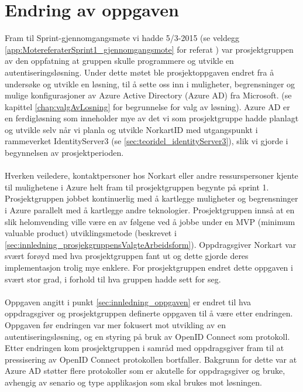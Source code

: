 \section{Endring av oppgaven}
\label{sec:innledning_endringAvOppgaven}
Fram til Sprint-gjennomgangsmøte vi hadde 5/3-2015 (se veldegg \ref{app:MotereferaterSprint1_gjennomgangsmote} for referat ) var prosjektgruppen av den oppfatning at gruppen skulle programmere og utvikle en autentiseringsløsning. Under dette møtet ble prosjektoppgaven endret fra å undersøke og utvikle en løsning, til å sette oss inn i muligheter, begrensninger og mulige konfigurasjoner av Azure Active Directory (Azure AD) fra Microsoft. (se kapittel \ref{chap:valgAvLosning} for begrunnelse for valg av løsning). Azure AD er en ferdigløsning som inneholder mye av det vi som prosjektgruppe hadde planlagt og utvikle selv når vi planla og utvikle NorkartID med utgangspunkt i rammeverket IdentityServer3 (se \ref{sec:teoridel_identityServer3}), slik vi gjorde i begynnelsen av prosjektperioden. 
\\
\\
Hverken veiledere, kontaktpersoner hos Norkart eller andre ressurspersoner kjente til mulighetene i Azure helt fram til prosjektgruppen begynte på sprint 1. Prosjektgruppen jobbet kontinuerlig med å kartlegge muligheter og begrensninger i Azure parallelt med å kartlegge andre teknologier. Prosjektgruppen innså at en slik helomvending ville være en av følgene ved å jobbe under en MVP (minimum valuable product) utviklingsmetode (beskrevet i \ref{sec:innledning_prosjekgruppensValgteArbeidsform}). Oppdragsgiver Norkart var svært forøyd med hva prosjektgruppen fant ut og dette gjorde deres implementasjon trolig mye enklere. For prosjektgruppen endret dette oppgaven i svært stor grad, i forhold til hva gruppen hadde sett for seg. 
\\
\\
Oppgaven angitt i punkt \ref{sec:innledning_oppgaven} er endret til hva oppdragsgiver og prosjektgruppen definerte oppgaven til å være etter endringen. Oppgaven før endringen var mer fokusert mot utvikling av en autentiseringsløsning, og en styring på bruk av OpenID Connect som protokoll. Etter endringen kom prosjektgruppen i samråd med oppdragsgiver fram til at pressisering av OpenID Connect protokollen bortfaller. Bakgrunn for dette var at Azure AD støtter flere protokoller som er akutelle for oppdragsgiver og bruke, avhengig av senario og type applikasjon som skal brukes mot løsningen.
\\
\\
